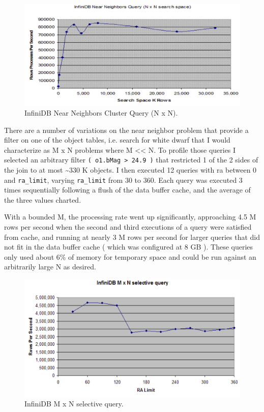 \documentclass[DM,lsstdraft,toc]{lsstdoc}
\begin{document}
\begin{figure}[H]
\centering
\includegraphics{_static/infinidb_near_neighbors.png}
\caption{InfiniDB Near Neighbors Cluster Query (N x N).}
\end{figure}

There are a number of variations on the near neighbor problem that
provide a filter on one of the object tables, i.e. search for white
dwarf that I would characterize as M x N problems where M
\textless{}\textless{} N. To profile those queries I selected an
arbitrary filter \texttt{(\ o1.bMag\ \textgreater{}\ 24.9\ )} that
restricted 1 of the 2 sides of the join to at most \textasciitilde{}330
K objects. I then executed 12 queries with ra between 0 and
\texttt{ra\_limit}, varying \texttt{ra\_limit} from 30 to 360. Each
query was executed 3 times sequentially following a flush of the data
buffer cache, and the average of the three values charted.

With a bounded M, the processing rate went up significantly, approaching
4.5 M rows per second when the second and third executions of a query
were satisfied from cache, and running at nearly 3 M rows per second for
larger queries that did not fit in the data buffer cache ( which was
configured at 8 GB ). These queries only used about 6\% of memory for
temporary space and could be run against an arbitrarily large N as
desired.

\begin{figure}[H]
\centering
\includegraphics{_static/infinidb_m_n_selective_query.png}
\caption{InfiniDB M x N selective query.}
\end{figure}
\end{document}
